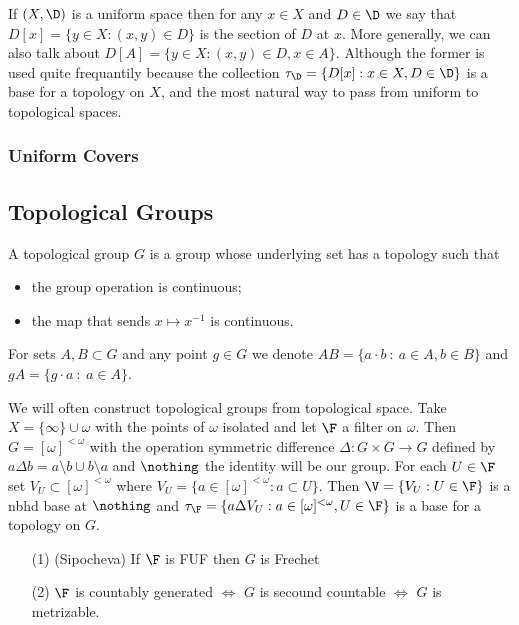 \documentclass{article}
\begin{document}
    If \((X, \D)\) is a uniform space then for any \(x \in X\) and \(D \in \D\) we say that \(D[x] = \{y \in X:(x, y) \in D\}\) is the section of \(D\) at \(x\). More generally, we can also talk about \(D[A]=\{y \in X:(x, y) \in D, x \in A\}\). Although the former is used quite frequantily because the collection \(\tau_{\D} = \{D[x]:x \in X, D \in \D\}\) is a base for a topology on \(X\), and the most natural way to pass from uniform to topological spaces.
\subsubsection{Uniform Covers}

\subsection{Topological Groups}
\begin{defn}
    A topological group \(G\) is a group whose underlying set has a topology such that 
    \begin{itemize}
        \item the group operation is continuous;
        \item the map that sends \(x \mapsto x^{-1}\) is continuous.
    \end{itemize}
    For sets \(A, B \subset G\) and any point \(g \in G\) we denote \(AB = \{a\cdot b \: : \: a \in A, b \in B\}\) and \(gA = \{g\cdot a \: : \: a \in A\}\).
\end{defn}
 

We will often construct topological groups from topological space. Take \(X = \{\infty\} \cup \omega\) with the points of \(\omega\) isolated and let \(\F\) a filter on \(\omega\). Then \(G = [\omega]^{<\omega}\) with the operation symmetric difference \(\Delta: G \times G \to G\) defined by \(a\Delta b = a\setminus b \cup b\setminus a\) and \(\nothing\) the identity will be our group. For each \(U \in \F\) set \(V_U \subset [\omega]^{<\omega}\) where \(V_U = \{a \in [\omega]^{<\omega}: a \subset U\}\). Then \(\V = \{V_U : U \in \F\}\) is a nbhd base at \(\nothing\) and \(\tau_{\F} = \{a\Delta V_U : a \in [\omega]^{<\omega}, U 
\in \F\}\) is a base for a topology on \(G\).

\begin{prop}
    \leavevmode
    \begin{enumerate}
        \item[(1)] (Sipocheva) If \(\F\) is FUF then \(G\) is Frechet
        \item[(2)] \(\F\) is countably generated \(\iff\) \(G\) is secound countable \(\iff\) \(G\) is metrizable.
    \end{enumerate}
\end{prop}
\end{document}
